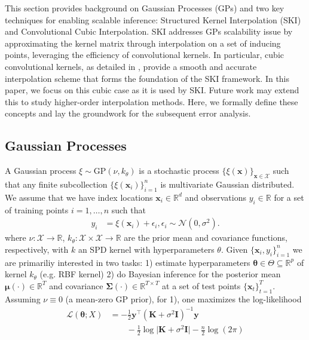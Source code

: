 
This section provides background on Gaussian Processes (GPs) and two key techniques for enabling scalable inference: Structured Kernel Interpolation (SKI) and Convolutional Cubic Interpolation. SKI \cite{wilson2015kernel} addresses GPs scalability issue by approximating the kernel matrix through interpolation on a set of inducing points, leveraging the efficiency of convolutional kernels. In particular, cubic convolutional kernels, as detailed in \cite{keys1981cubic}, provide a smooth and accurate interpolation scheme that forms the foundation of the SKI framework. In this paper, we focus on this cubic case as it is used by SKI. Future work may extend this to study higher-order interpolation methods. Here, we formally define these concepts and lay the groundwork for the subsequent error analysis.

\subsection{Gaussian Processes}\label{sec:gp-background}
A Gaussian process $\xi\sim \textrm{GP}(\nu,k_\theta)$ is a stochastic process $\{\xi(\textbf{x})\}_{\textbf{x}\in \mathcal{X}}$ such that any finite subcollection $\{\xi(\textbf{x}_i)\}_{i=1}^n$ is multivariate Gaussian distributed. We assume that we have index locations $\textbf{x}_i\in \mathbb{R}^d$ and observations $y_i\in \mathbb{R}$ for a set of training points $i=1,\ldots,n$ such that
\begin{align*}
y_i&=\xi(\textbf{x}_i)+\epsilon_i,\epsilon_i\sim \mathcal{N}(0,\sigma^2).
\end{align*}
where $\nu:\mathcal{X}\rightarrow\mathbb{R}$, $k_\theta:\mathcal{X}\times \mathcal{X}\rightarrow\mathbb{R}$ are the prior mean and covariance functions, respectively, with $k$ an SPD kernel with hyperparameters $\theta$. Given $\{\textbf{x}_i,y_i\}_{i=1}^n$ we are primariliy interested in two tasks: 1) estimate hyperparameters $\boldsymbol{\theta}\in \Theta\subseteq \mathbb{R}^p$ of kernel $k_\theta$ (e.g. RBF kernel) 2) do Bayesian inference for the posterior mean $\boldsymbol{\mu}(\cdot)\in \mathbb{R}^{T}$ and covariance $\boldsymbol{\Sigma}(\cdot)\in \mathbb{R}^{T\times T}$ at a set of test points $\{\textbf{x}_t\}_{t=1}^T$. Assuming $\nu\equiv 0$ (a mean-zero GP prior), for 1), one maximizes the log-likelihood
\begin{align}
    \mathcal{L}(\boldsymbol{\theta};X) &= -\frac{1}{2}\textbf{y}^\top (\textbf{K}+\sigma^2 \textbf{I})^{-1}\textbf{y}\nonumber\\
    &\qquad-\frac{1}{2}\log \vert \textbf{K}+\sigma^2 \textbf{I}\vert -\frac{n}{2}\log (2\pi)\label{eqn:log-likelihood}
\end{align}
